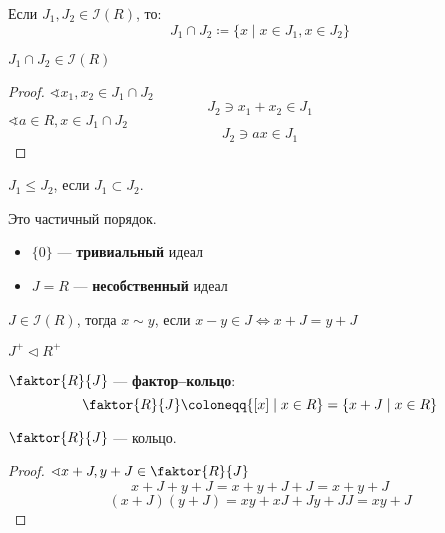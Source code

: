 \begin{definition}
    Если \(J_1, J_2 \in \mathcal{I}(R)\), то:
    \[J_1 \cap J_2 \coloneqq \{x \mid x \in J_1, x \in J_2\}\]
\end{definition}
\begin{theorem}
    \(J_1 \cap J_2 \in \mathcal{I}(R)\)
\end{theorem}
\begin{proof}
    \(\sphericalangle x_1, x_2 \in J_1 \cap J_2\)
    \[J_2 \ni x_1 + x_2 \in J_1\]
    \(\sphericalangle a \in R, x \in J_1 \cap J_2\)
    \[J_2 \ni ax \in J_1\]
\end{proof}

\begin{definition}
    \(J_1 \leq J_2\), если \(J_1 \subset J_2\).
\end{definition}

\begin{remark}
    Это частичный порядок.
\end{remark}

\begin{definition}\itemfix
    \begin{itemize}
        \item \(\{0\}\) --- \textbf{тривиальный} идеал
        \item \(J = R\) --- \textbf{несобственный} идеал
    \end{itemize}
\end{definition}

\begin{definition}
    \(J \in \mathcal{I}(R)\), тогда \(x \sim y\), если \(x - y \in J \Leftrightarrow x + J = y + J\)
\end{definition}

\begin{remark}
    \(J^+ \vartriangleleft R^+\)
\end{remark}

\begin{definition}
    \(\faktor{R}{J}\) --- \textbf{фактор--кольцо}:
    \[\faktor{R}{J} \coloneqq \{[x] \mid x \in R\} = \{x + J \mid x \in R\}\]
\end{definition}

\begin{theorem}
    \(\faktor{R}{J}\) --- кольцо.
\end{theorem}
\begin{proof}
    \(\sphericalangle x + J, y + J \in \faktor{R}{J}\)
    \[x + J + y + J = x + y + J + J = x + y + J\]
    \[(x + J)(y + J) = xy + xJ + Jy + JJ = xy + J\]
\end{proof}

